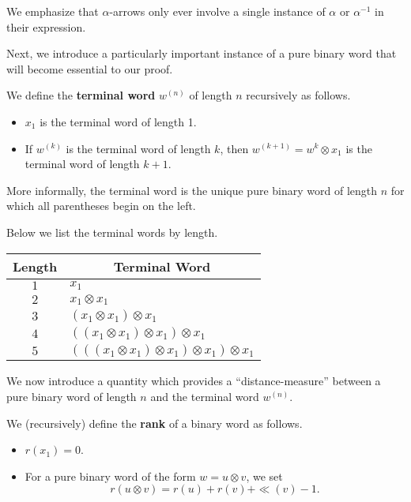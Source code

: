 We emphasize that $\alpha$-arrows only ever involve a single 
instance of $\alpha$ or $\alpha^{-1}$ in their expression.


Next, we introduce a particularly important instance of a pure binary word that will 
become essential to our proof. 

\begin{definition}
    We define the \textbf{terminal word} 
    $w^{(n)}$ of length $n$ recursively as follows. 
    \begin{itemize}
        \item $x_1$ is the terminal word of length 1.
        \item If $w^{(k)}$ is the terminal word of length $k$, then 
        $w^{(k+1)} = w^{k}\otimes x_1$ is the terminal word of length $k+1$. 
    \end{itemize}
    More informally, the terminal word is the unique pure binary 
    word of length $n$ for which all parentheses begin on the left.
\end{definition} 

\begin{example}
    Below we list the terminal words by length.
    \begin{center}
        \begin{tabular}{|c | l|}
            \hline
            Length & \multicolumn{1}{c|}{Terminal Word}\\
            \hline
            $1$ & $x_1$\\
            $2$ & $x_1 \otimes x_1 $\\
            $3$ & $(x_1 \otimes x_1)\otimes x_1 $\\
            $4$ & $((x_1 \otimes x_1)\otimes x_1)\otimes x_1 $\\
            $5$ & $(((x_1 \otimes x_1)\otimes x_1)\otimes x_1)\otimes x_1$\\
            \hline
        \end{tabular}
    \end{center}

\end{example}


We now introduce a quantity which provides a ``distance-measure''
between a pure binary word of length $n$ and the terminal word $w^{(n)}$.

\begin{definition}
    We (recursively) define 
    the \textbf{rank} of a binary word as follows.
    \begin{itemize}
        \item $r(x_1) = 0$.
        \item For a pure binary word of the form $w = u \otimes v$, we set 
        \[
            r(u\otimes v) = r(u) + r(v) + \ll(v) - 1.
        \]
    \end{itemize}
\end{definition}

